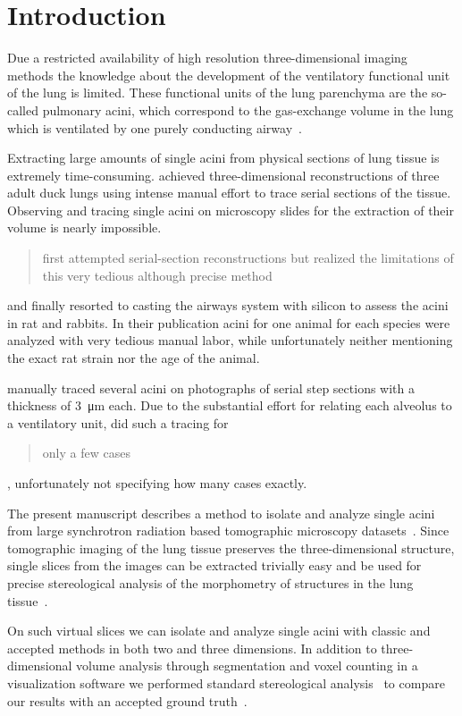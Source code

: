 \documentclass[paper=a4,abstract=true,english,DIV=calc]{scrartcl}
\begin{document}
\tableofcontents
\clearpage

\section{Introduction}
Due a restricted availability of high resolution three-dimensional imaging methods the knowledge about the development of the ventilatory functional unit of the lung is limited.
These functional units of the lung parenchyma are the so-called pulmonary acini, which correspond to the gas-exchange volume in the lung which is ventilated by one purely conducting airway~\cite{Rodriguez1987}.

Extracting large amounts of single acini from physical sections of lung tissue is extremely time-consuming.
\citet{Woodward2005} achieved three-dimensional reconstructions of three adult duck lungs using intense manual effort to trace serial sections of the tissue.
Observing and tracing single acini on microscopy slides for the extraction of their volume is nearly impossible.
\citet{Rodriguez1987} \blockquote{first attempted serial-section reconstructions but realized the limitations of this very tedious although precise method} and finally resorted to casting the airways system with silicon to assess the acini in rat and rabbits.
In their publication acini for one animal for each species were analyzed with very tedious manual labor, while unfortunately neither mentioning the exact rat strain nor the age of the animal.

\citet{Mercer1987a} manually traced several acini on photographs of serial step sections with a thickness of \SI{3}{\micro\meter} each.
Due to the substantial effort for relating each alveolus to a ventilatory unit, \citeauthor{Mercer1987a} did such a tracing for \blockquote{only a few cases}, unfortunately not specifying how many cases exactly.

The present manuscript describes a method to isolate and analyze single acini from large synchrotron radiation based tomographic microscopy datasets~\cite{Haberthuer2010a}.
Since tomographic imaging of the lung tissue preserves the three-dimensional structure, single slices from the images can be extracted trivially easy and be used for precise stereological analysis of the morphometry of structures in the lung tissue~\cite{Hsia2010}.

On such virtual slices we can isolate and analyze single acini with classic and accepted methods in both two and three dimensions.
In addition to three-dimensional volume analysis through segmentation and voxel counting in a visualization software we performed standard stereological analysis~\cite{Hsia2010} to compare our results with an accepted ground truth~\cite{Rodriguez1987,Tschanz2003}.
\end{document}
